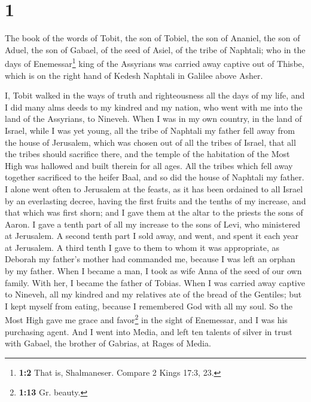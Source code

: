 \hypertarget{section}{%
\section{1}\label{section}}

 The book of the words of Tobit, the son of Tobiel, the
son of Ananiel, the son of Aduel, the son of Gabael, of the seed of
Asiel, of the tribe of Naphtali;  who in the days of
Enemessar\footnote{\textbf{1:2} That is, Shalmaneser. Compare 2 Kings
  17:3, 23.} king of the Assyrians was carried away captive out of
Thisbe, which is on the right hand of Kedesh Naphtali in Galilee above
Asher.

 I, Tobit walked in the ways of truth and righteousness
all the days of my life, and I did many alms deeds to my kindred and my
nation, who went with me into the land of the Assyrians, to Nineveh.
 When I was in my own country, in the land of Israel,
while I was yet young, all the tribe of Naphtali my father fell away
from the house of Jerusalem, which was chosen out of all the tribes of
Israel, that all the tribes should sacrifice there, and the temple of
the habitation of the Most High was hallowed and built therein for all
ages.  All the tribes which fell away together sacrificed
to the heifer Baal, and so did the house of Naphtali my father.
 I alone went often to Jerusalem at the feasts, as it has
been ordained to all Israel by an everlasting decree, having the first
fruits and the tenths of my increase, and that which was first shorn;
and I gave them at the altar to the priests the sons of Aaron.
 I gave a tenth part of all my increase to the sons of
Levi, who ministered at Jerusalem. A second tenth part I sold away, and
went, and spent it each year at Jerusalem.  A third tenth
I gave to them to whom it was appropriate, as Deborah my father's mother
had commanded me, because I was left an orphan by my father.
 When I became a man, I took as wife Anna of the seed of
our own family. With her, I became the father of Tobias. 
When I was carried away captive to Nineveh, all my kindred and my
relatives ate of the bread of the Gentiles;  but I kept
myself from eating,  because I remembered God with all my
soul.  So the Most High gave me grace and
favor\footnote{\textbf{1:13} Gr. beauty.} in the sight of Enemessar, and
I was his purchasing agent.  And I went into Media, and
left ten talents of silver in trust with Gabael, the brother of Gabrias,
at Rages of Media.

